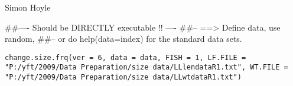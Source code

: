 \documentclass[a4paper]{book}
\begin{document}
%
\begin{Arguments}
\begin{ldescription}
\item[\code{doitall}] 


\item[\code{flagtype}] 


\item[\code{flagnum}] 


\item[\code{newval}] 


\end{ldescription}
\end{Arguments}
%
\begin{Author}\relax
Simon Hoyle

\end{Author}
%
\begin{Examples}
\begin{ExampleCode}
##---- Should be DIRECTLY executable !! ----
##-- ==>  Define data, use random,
##--	or do  help(data=index)  for the standard data sets.

\end{ExampleCode}
\end{Examples}
%
\begin{Usage}
\begin{verbatim}
change.size.frq(ver = 6, data = data, FISH = 1, LF.FILE = "P:/yft/2009/Data Preparation/size data/LLlendataR1.txt", WT.FILE = "P:/yft/2009/Data Preparation/size data/LLwtdataR1.txt")
\end{verbatim}
\end{Usage}
%
\begin{Arguments}
\begin{ldescription}
\item[\code{ver}] 


\item[\code{data}] 


\item[\code{FISH}] 


\item[\code{LF.FILE}] 


\item[\code{WT.FILE}] 


\end{ldescription}
\end{Arguments}
\end{document}
